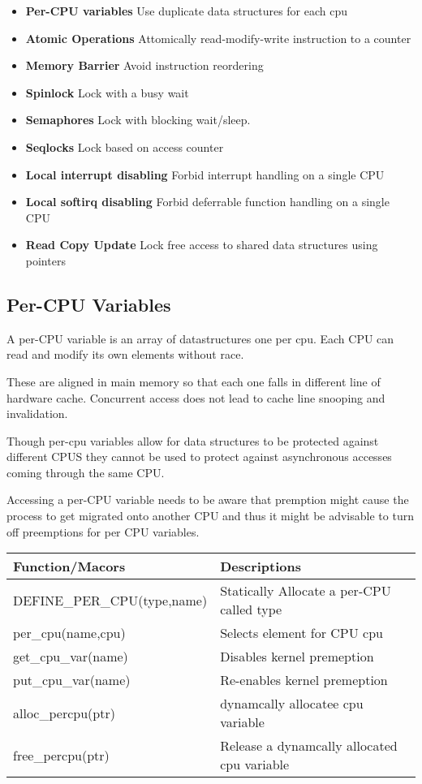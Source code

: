 \documentclass{article}
\begin{document}
\begin{itemize}
\item \textbf{Per-CPU variables}
  Use duplicate data structures for each cpu
\item \textbf{Atomic Operations}
  Attomically read-modify-write instruction to a counter
\item \textbf{Memory Barrier}
  Avoid instruction reordering
\item  \textbf{Spinlock}
  Lock with a busy wait
\item \textbf{Semaphores}
  Lock with blocking wait/sleep.
\item \textbf{Seqlocks}
  Lock based on access counter
\item \textbf{Local interrupt disabling}
  Forbid interrupt handling on a single CPU
\item \textbf{Local softirq disabling}
  Forbid deferrable function handling on a single CPU
\item \textbf{Read Copy Update}
  Lock free access to shared data structures using pointers
\end{itemize}


\subsection{Per-CPU Variables}

A per-CPU variable is an array of datastructures one per cpu. Each CPU
can read and modify its own elements without race.

These are aligned in main memory so that each one falls in different
line of hardware cache. Concurrent access does not lead to cache line
snooping and invalidation.

Though per-cpu variables allow for data structures to be protected
against different CPUS they cannot be used to protect against
asynchronous accesses coming through the same CPU.

Accessing a per-CPU variable needs to be aware that premption might
cause the process to get migrated onto another CPU and thus it might
be advisable to turn off preemptions for per CPU variables.


\begin{center}
  \begin{tabular}{ l | l }
    
    \hline
    Function/Macors & Descriptions \\ \hline
    DEFINE\_PER\_CPU(type,name) & Statically Allocate a per-CPU called type \\ 
    per\_cpu(name,cpu) & Selects element for CPU cpu \\ 
    get\_cpu\_var(name) &  Disables kernel premeption \\
    put\_cpu\_var(name) &  Re-enables kernel premeption \\
    alloc\_percpu(ptr) &  dynamcally allocatee cpu variable \\
    free\_percpu(ptr) &  Release a dynamcally allocated cpu variable \\
    \hline
  \end{tabular}
\end{center}
\end{document}
